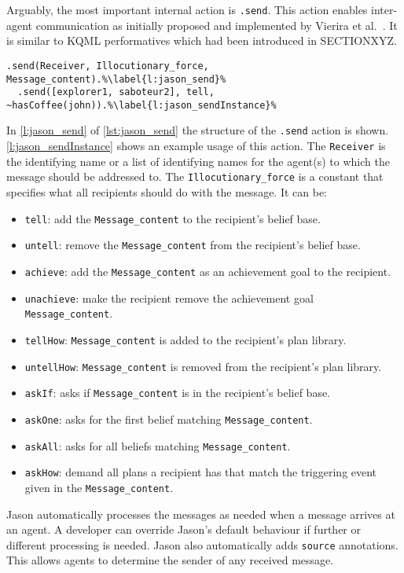 Arguably, the most important  internal action is \texttt{.send}. This action enables inter-agent communication as initially proposed and implemented by Vierira et al.~\cite{vieira_formal_2007}. It is similar to KQML performatives which had been introduced in SECTIONXYZ. %
\begin{lstlisting}[caption={Parameters of the internal action \texttt{.send} and an example.}, label=lst:jason_send]
  .send(Receiver, Illocutionary_force, Message_content).%\label{l:jason_send}%
  .send([explorer1, saboteur2], tell, ~hasCoffee(john)).%\label{l:jason_sendInstance}%
\end{lstlisting}
In \autoref{l:jason_send} of \autoref{lst:jason_send} the structure of the \texttt{.send} action is shown. \autoref{l:jason_sendInstance} shows an example usage of this action. The \texttt{Receiver} is the identifying name or a list of identifying names for the agent(s) to which the message should be addressed to. The \texttt{Illocutionary_force} is a constant that specifies what all recipients should do with the message. It can be:
\begin{itemize}
  \item \texttt{tell}: add the \texttt{Message_content} to the recipient's belief base.
  \item \texttt{untell}: remove the \texttt{Message_content} from the recipient's belief base.
  \item \texttt{achieve}: add the \texttt{Message_content} as an achievement goal to the recipient.
  \item \texttt{unachieve}: make the recipient remove the achievement goal \texttt{Message_content}.
  \item \texttt{tellHow}: \texttt{Message_content} is added to the recipient's plan library.
  \item \texttt{untellHow}: \texttt{Message_content} is removed from the recipient's plan library.
  \item \texttt{askIf}: asks if \texttt{Message_content} is in the recipient's belief base.
  \item \texttt{askOne}: asks for the first belief matching \texttt{Message_content}.
  \item \texttt{askAll}: asks for all beliefs matching \texttt{Message_content}.
  \item \texttt{askHow}: demand all plans a recipient has that match the triggering event given in the \texttt{Message_content}.
\end{itemize}
Jason automatically processes the messages as needed when a message arrives at an agent. %
A developer can override Jason's default behaviour if further or different processing is needed. Jason also automatically adds \texttt{source} annotations. This allows agents to determine the sender of any received message.

